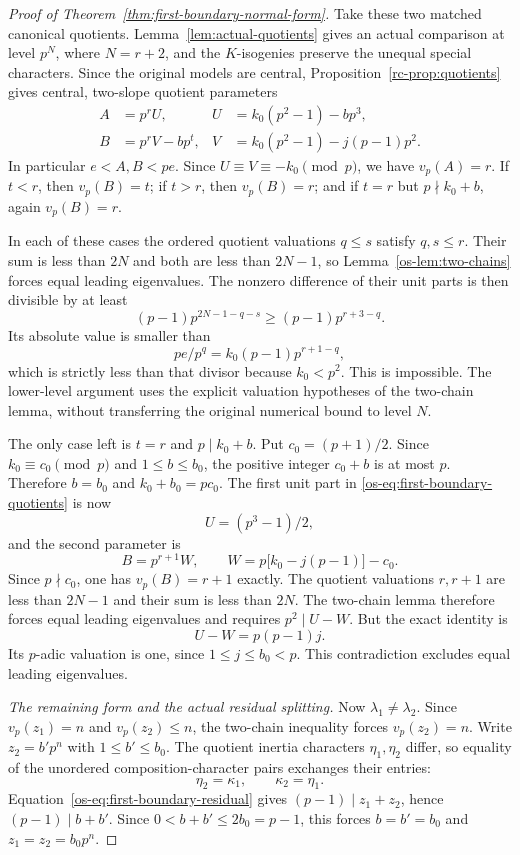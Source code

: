 \begin{proof}[Proof of Theorem~\ref{thm:first-boundary-normal-form}]
Take these two matched canonical quotients.
Lemma~\ref{lem:actual-quotients} gives an actual comparison at level
$p^N$, where $N=r+2$, and the $K$-isogenies preserve the unequal
special characters. Since the original models are central,
Proposition~\ref{rc-prop:quotients} gives central, two-slope
quotient parameters
\begin{equation}\label{os-eq:first-boundary-quotients}
 \begin{aligned}
 A&=p^rU,& U&=k_0(p^2-1)-bp^3,\\
 B&=p^rV-bp^t,& V&=k_0(p^2-1)-j(p-1)p^2.
 \end{aligned}
\end{equation}
In particular $e<A,B<pe$. Since $U\equiv V\equiv-k_0\pmod p$,
we have $v_p(A)=r$. If $t<r$, then $v_p(B)=t$; if $t>r$, then
$v_p(B)=r$; and if $t=r$ but $p\nmid k_0+b$, again $v_p(B)=r$.

In each of these cases the ordered quotient valuations $q\le s$
satisfy $q,s\le r$. Their sum is less than $2N$ and both are less
than $2N-1$, so Lemma~\ref{os-lem:two-chains} forces equal leading
eigenvalues. The nonzero difference of their unit parts is then
divisible by at least
\[
 (p-1)p^{2N-1-q-s}\ge(p-1)p^{r+3-q}.
\]
Its absolute value is smaller than
\[
 pe/p^q=k_0(p-1)p^{r+1-q},
\]
which is strictly less than that divisor because $k_0<p^2$.
This is impossible. The lower-level argument uses the explicit
valuation hypotheses of the two-chain lemma, without transferring
the original numerical bound to level $N$.

The only case left is $t=r$ and $p\mid k_0+b$.
Put $c_0=(p+1)/2$. Since $k_0\equiv c_0\pmod p$ and
$1\le b\le b_0$, the positive integer $c_0+b$ is at most $p$.
Therefore $b=b_0$ and $k_0+b_0=pc_0$. The first unit part in
\eqref{os-eq:first-boundary-quotients} is now
\[
 U=(p^3-1)/2,
\]
and the second parameter is
\[
 B=p^{r+1}W,\qquad W=p\bigl[k_0-j(p-1)\bigr]-c_0.
\]
Since $p\nmid c_0$, one has $v_p(B)=r+1$ exactly.
The quotient valuations $r,r+1$ are less than $2N-1$ and their
sum is less than $2N$. The two-chain lemma therefore forces equal
leading eigenvalues and requires $p^2\mid U-W$. But the exact
identity is
\[
 U-W=p(p-1)j.
\]
Its $p$-adic valuation is one, since $1\le j\le b_0<p$.
This contradiction excludes equal leading eigenvalues.

\smallskip\noindent
\emph{The remaining form and the actual residual splitting.}
Now $\lambda_1\ne\lambda_2$. Since $v_p(z_1)=n$ and
$v_p(z_2)\le n$, the two-chain inequality forces $v_p(z_2)=n$.
Write $z_2=b'p^n$ with $1\le b'\le b_0$. The quotient inertia
characters $\eta_1,\eta_2$ differ, so equality of the unordered
composition-character pairs exchanges their entries:
\[
 \eta_2=\kappa_1,\qquad \kappa_2=\eta_1.
\]
Equation~\eqref{os-eq:first-boundary-residual} gives
$(p-1)\mid z_1+z_2$, hence $(p-1)\mid b+b'$. Since
$0<b+b'\le2b_0=p-1$, this forces $b=b'=b_0$ and
$z_1=z_2=b_0p^n$.


\end{proof}
